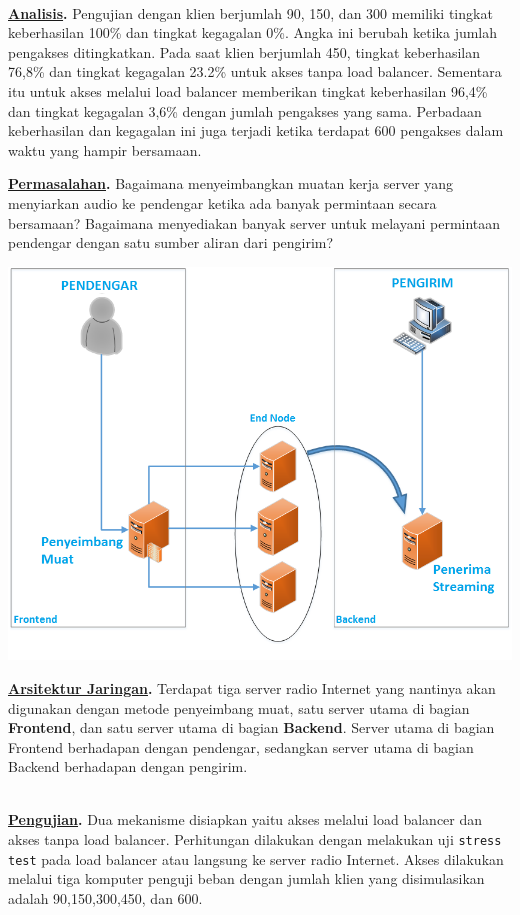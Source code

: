 \documentclass[a0,portrait]{a0poster}
\begin{document}
\begin{multicols}{2}
\begin{tcolorbox}[colback=blue!5!white,colframe=blue!75!black,title=Pengujian]
	\ \\
	\textbf{\underline{Analisis}.} Pengujian dengan klien berjumlah 90, 150, dan 300 memiliki tingkat keberhasilan 100\% dan tingkat kegagalan 0\%. Angka ini berubah ketika jumlah pengakses ditingkatkan. Pada saat klien berjumlah 450, tingkat keberhasilan 76,8\% dan tingkat kegagalan 23.2\% untuk akses tanpa load balancer. Sementara itu untuk akses melalui load balancer memberikan tingkat keberhasilan 96,4\% dan tingkat kegagalan 3,6\% dengan jumlah pengakses yang sama. Perbadaan keberhasilan dan kegagalan ini juga terjadi ketika terdapat 600 pengakses dalam waktu yang hampir bersamaan.
		
		
\end{tcolorbox}

\begin{tcolorbox}[colback=blue!5!white,colframe=blue!75!black,title=Metode]
	\textbf{\underline{Permasalahan}.} Bagaimana menyeimbangkan muatan kerja server yang	menyiarkan audio ke pendengar ketika ada banyak permintaan secara bersamaan? Bagaimana menyediakan banyak server untuk melayani permintaan pendengar dengan satu sumber aliran dari pengirim?
	
	\begin{center}
		\includegraphics[width=0.7\linewidth]{arsitektur}
	\end{center}

	\textbf{\underline{Arsitektur Jaringan}.} Terdapat tiga server radio Internet yang nantinya akan digunakan dengan metode penyeimbang muat, satu server utama di bagian \textbf{Frontend\textit{}}, dan satu server utama di bagian \textbf{Backend\textit{}}. Server utama di bagian Frontend berhadapan dengan pendengar, sedangkan server utama di bagian Backend berhadapan dengan pengirim.
	
	\ \\
	\textbf{\underline{Pengujian}.} Dua mekanisme disiapkan yaitu akses melalui load balancer dan akses tanpa load balancer. Perhitungan dilakukan dengan melakukan uji \texttt{stress test} pada load balancer atau langsung ke server radio Internet. Akses dilakukan melalui tiga komputer penguji beban dengan jumlah klien yang disimulasikan adalah 90,150,300,450, dan 600.
	



\end{tcolorbox}
\end{multicols}
\end{document}
